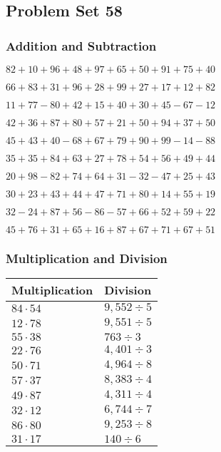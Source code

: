 \hypertarget{problem-set-58}{%
\subsection{Problem Set 58}\label{problem-set-58}}

\hypertarget{addition-and-subtraction}{%
\subsubsection{Addition and
Subtraction}\label{addition-and-subtraction}}

\(82+10+96+48+97+65+50+91+75+40\)

\(66+83+31+96+28+99+27+17+12+82\)

\(11+77-80+42+15+40+30+45-67-12\)

\(42+36+87+80+57+21+50+94+37+50\)

\(45+43+40-68+67+79+90+99-14-88\)

\(35+35+84+63+27+78+54+56+49+44\)

\(20+98-82+74+64+31-32-47+25+43\)

\(30+23+43+44+47+71+80+14+55+19\)

\(32-24+87+56-86-57+66+52+59+22\)

\(45+76+31+65+16+87+67+71+67+51\)

\hypertarget{multiplication-and-division}{%
\subsubsection{Multiplication and
Division}\label{multiplication-and-division}}

\begin{longtable}[]{@{}ll@{}}
\toprule
Multiplication & Division\tabularnewline
\midrule
\endhead
\(84\cdot54\) & \(9,552÷5\)\tabularnewline
\(12\cdot78\) & \(9,551÷5\)\tabularnewline
\(55\cdot38\) & \(763÷3\)\tabularnewline
\(22\cdot76\) & \(4,401÷3\)\tabularnewline
\(50\cdot71\) & \(4,964÷8\)\tabularnewline
\(57\cdot37\) & \(8,383÷4\)\tabularnewline
\(49\cdot87\) & \(4,311÷4\)\tabularnewline
\(32\cdot12\) & \(6,744÷7\)\tabularnewline
\(86\cdot80\) & \(9,253÷8\)\tabularnewline
\(31\cdot17\) & \(140÷6\)\tabularnewline
\bottomrule
\end{longtable}
